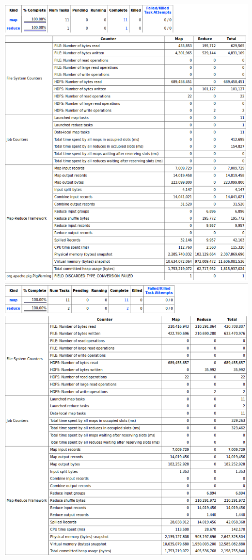 \documentclass[11pt]{article} %
\begin{document}
\includegraphics[scale=0.8]{pig1.png}
\includegraphics[scale=0.8]{java1.png}
\end{document}
